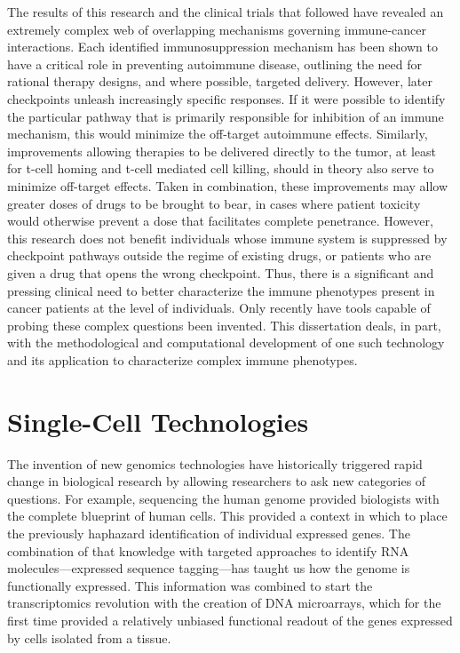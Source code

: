 The results of this research and the clinical trials that followed have revealed an extremely complex web of overlapping mechanisms governing immune-cancer interactions. 
Each identified immunosuppression mechanism has been shown to have a critical role in preventing autoimmune disease, outlining the need for rational therapy designs, and where possible, targeted delivery. 
However, later checkpoints unleash increasingly specific responses. 
If it were possible to identify the particular pathway that is primarily responsible for inhibition of an immune mechanism, this would minimize the off-target autoimmune effects. 
Similarly, improvements allowing therapies to be delivered directly to the tumor, at least for t-cell homing and t-cell mediated cell killing, should in theory also serve to minimize off-target effects. 
Taken in combination, these improvements may allow greater doses of drugs to be brought to bear, in cases where patient toxicity would otherwise prevent a dose that facilitates complete penetrance. 
However, this research does not benefit individuals whose immune system is suppressed by checkpoint pathways outside the regime of existing drugs, or patients who are given a drug that opens the wrong checkpoint. 
Thus, there is a significant and pressing clinical need to better characterize the immune phenotypes present in cancer patients at the level of individuals. 
Only recently have tools capable of probing these complex questions been invented.
This dissertation deals, in part, with the methodological and computational development of one such technology and its application to characterize complex immune phenotypes. 

\section{Single-Cell Technologies}

The invention of new genomics technologies have historically triggered rapid change in biological research by allowing researchers to ask new categories of questions. 
For example, sequencing the human genome provided biologists with the complete blueprint of human cells. 
This provided a context in which to place the previously haphazard identification of individual expressed genes. 
The combination of that knowledge with targeted approaches to identify RNA molecules---expressed sequence tagging---has taught us how the genome is functionally expressed. 
This information was combined to start the transcriptomics revolution with the creation of DNA microarrays, which for the first time provided a relatively unbiased functional readout of the genes expressed by cells isolated from a tissue. %

